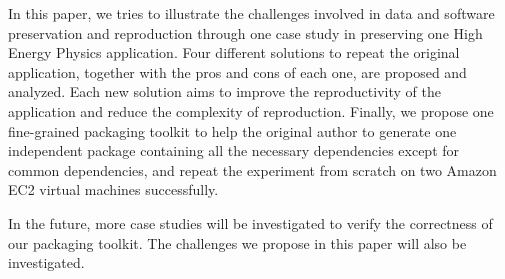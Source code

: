 \documentclass{acm_proc_article-sp}
\begin{document}
In this paper, we tries to illustrate the challenges involved in data and software preservation and reproduction through one case study in preserving one High Energy Physics application.
Four different solutions to repeat the original application, together with the pros and cons of each one, are proposed and analyzed. Each new solution aims to improve the reproductivity of the application and reduce the complexity of reproduction. Finally, we propose one fine-grained packaging toolkit to help the original author to generate one independent package containing all the necessary dependencies except for common dependencies, and repeat the experiment from scratch on two Amazon EC2 virtual machines successfully.

In the future, more case studies will be investigated to verify the correctness of our packaging toolkit. The challenges we propose in this paper will also be investigated.



\end{document}
